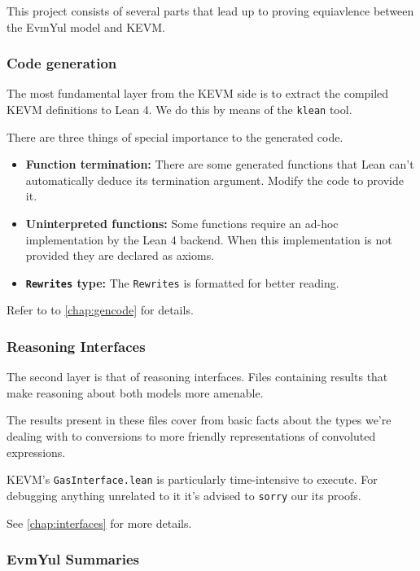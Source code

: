 This project consists of several parts that lead up to proving equiavlence
between the EvmYul model and KEVM.

\subsubsection*{Code generation}

The most fundamental layer from the KEVM side is to extract the compiled KEVM
definitions to Lean 4. We do this by means of the \texttt{klean} tool.

There are three things of special importance to the generated code.

\begin{itemize}
\item \textbf{Function termination:} There are some generated functions that
  Lean can't automatically deduce its termination argument. Modify the code to
  provide it.
\item \textbf{Uninterpreted functions:} Some functions require an ad-hoc
  implementation by the Lean 4 backend. When this implementation is not provided
  they are declared as axioms.
\item \textbf{\texttt{Rewrites} type:} The \texttt{Rewrites} is formatted for
  better reading.
\end{itemize}

Refer to to \ref{chap:gencode} for details.

\subsubsection*{Reasoning Interfaces}

The second layer is that of reasoning interfaces. Files containing results that
make reasoning about both models more amenable.

The results present in these files cover from basic facts about the types we're
dealing with to conversions to more friendly representations of convoluted
expressions.

KEVM's \texttt{GasInterface.lean} is particularly time-intensive to execute. For
debugging anything unrelated to it it's advised to \texttt{sorry} our its
proofs.

See \ref{chap:interfaces} for more details.

\subsubsection*{EvmYul Summaries}

